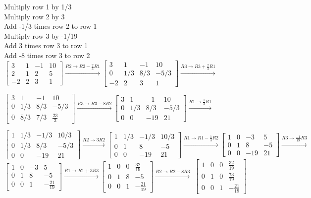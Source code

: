 \documentclass[12pt]{article}
\begin{document}
Multiply row 1 by 1/3\\
Multiply row 2 by 3\\
Add -1/3 times row 2 to row 1\\
Multiply row 3 by -1/19\\
Add 3 times row 3 to row 1\\
Add -8 times row 3 to row 2\\

$
 \left[ \begin {array}{ccc|c} 3&1&-1&10\\ 2&1&2&5
\\ -2&2&3&1\end {array} \right]
\xrightarrow[]{R2\rightarrow R2-\frac{2}{3}R1}
\left[ 
\begin {array}{ccc|c} 3&1&-1&10\\ 0&1/3&8/3&-5/3
\\ -2&2&3&1\end {array} \right] 
\xrightarrow[]{R3\rightarrow R3+\frac{2}{3}R1}$

$
 \left[ \begin {array}{ccc|c} 3&1&-1&10\\ 0&1/3&8/3&-
5/3\\ 0&8/3&7/3&{\frac {23}{3}}\end {array} \right] 
\xrightarrow[]{R3\rightarrow R3-8R2}
\left[ \begin {array}{ccc|c} 3&1&-1&10\\ 0&1/3&8/3&
-5/3\\ 0&0&-19&21\end {array} \right] 
\xrightarrow[]{R1\rightarrow \frac{1}{3}R1}$

$
\left[ \begin {array}{ccc|c} 1&1/3&-1/3&10/3\\ 0&1/3
&8/3&-5/3\\ 0&0&-19&21\end {array} \right] 
\xrightarrow[]{R2\rightarrow 3R2}
\left[ 
\begin {array}{ccc|c} 1&1/3&-1/3&10/3\\ 0&1&8&-5
\\ 0&0&-19&21\end {array} \right] 
\xrightarrow[]{R1\rightarrow R1-\frac{1}{3}R2}

 \left[ \begin {array}{ccc|c} 1&0&-3&5\\ 0&1&8&-5
\\ 0&0&-19&21\end {array} \right] 
\xrightarrow[]{R3\rightarrow \frac{-1}{19}R3}
$
$
 \left[ 
\begin {array}{ccc|c} 1&0&-3&5\\ 0&1&8&-5
\\ 0&0&1&-{\frac {21}{19}}\end {array} \right] 
\xrightarrow[]{R1\rightarrow R1+3R3} 

\left[ \begin {array}{ccc|c} 1&0&0&{\frac {32}{19}}
\\ 0&1&8&-5\\ 0&0&1&-{\frac {21}{
19}}\end {array} \right] 
\xrightarrow[]{R2\rightarrow R2-8R3}
$
$
 \left[ \begin {array}{ccc|c} 1&0&0&{\frac {
32}{19}}\\ 0&1&0&{\frac {73}{19}}
\\ 0&0&1&-{\frac {21}{19}}\end {array} \right] 
$
\end{document}
